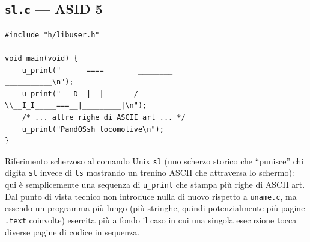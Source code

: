 \documentclass[11pt,a4paper]{article}
\newcommand{\code}[1]{\texttt{#1}}
\begin{document}
\subsection{\code{sl.c} --- ASID 5}
\begin{lstlisting}
#include "h/libuser.h"

void main(void) {
    u_print("      ====        ________                ___________\n");
    u_print("  _D _|  |_______/        \\__I_I_____===__|_________|\n");
    /* ... altre righe di ASCII art ... */
    u_print("PandOSsh locomotive\n");
}
\end{lstlisting}
Riferimento scherzoso al comando Unix \code{sl} (uno scherzo storico che
``punisce'' chi digita \code{sl} invece di \code{ls} mostrando un trenino
ASCII che attraversa lo schermo): qui è semplicemente una sequenza di
\code{u\_print} che stampa più righe di ASCII art. Dal punto di vista
tecnico non introduce nulla di nuovo rispetto a \code{uname.c}, ma essendo
un programma più lungo (più stringhe, quindi potenzialmente più pagine
\code{.text} coinvolte) esercita più a fondo il caso in cui una singola
esecuzione tocca diverse pagine di codice in sequenza.
\end{document}
